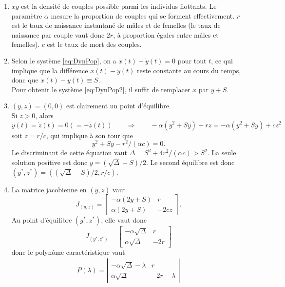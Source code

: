 \begin{enumerate}
  \item $xy$ est la densité de couples possible parmi les individus flottants. Le paramètre $\alpha$ mesure la proportion de couples qui se forment effectivement. $r$ est le taux de naissance instantané de mâles et de femelles (le taux de naissance par couple vaut donc $2r$, à proportion égales entre mâles et femelles). $c$ est le taux de mort des couples.
  \item Selon le système \eqref{eq:DynPop}, on a $\dot x(t) - \dot y(t) = 0$ pour tout $t$, ce qui implique que la différence $x(t) - y(t)$ reste constante au cours du temps, donc que $x(t) - y(t) \equiv S$. \\
  Pour obtenir le système \eqref{eq:DynPop2}, il suffit de remplacer $x$ par $y + S$.
  \item $(y, z) = (0, 0)$ est clairement un point d'équilibre. \\
  Si $z > 0$, alors
  $$
  \dot y(t) = \dot z(t) = 0 (= - \dot z (t)) 
  \qquad \Rightarrow \qquad 
  -\alpha (y^2 + Sy) + r z = -\alpha (y^2 + Sy) + c z^2
  $$
  soit $z = r/c$, qui implique à son tour que
  $$
  y^2 + Sy - r^2/(\alpha c) = 0.
  $$ 
  Le discriminant de cette équation vaut $\Delta = S^2 + 4r^2/(\alpha c) > S^2$. La seule solution positive est donc $y = (\sqrt{\Delta} - S)/2$. Le second équilibre est donc $(y^*, z^*) = ((\sqrt{\Delta} - S)/2, r/c)$.
  \item La matrice jacobienne en $(y, z)$ vaut
  $$
  J_{(y, z)} = \left[\begin{array}{rr}
                      - \alpha (2y + S) & r \\
                      \alpha (2y + S) & -2 cz
                     \end{array}\right].
  $$
  Au point d'équilibre $(y^*, z^*)$, elle vaut donc
  $$
  J_{(y^*, z^*)} = \left[\begin{array}{rr}
                          - \alpha \sqrt{\Delta} & r \\
                          \alpha \sqrt{\Delta} & -2 r
                        \end{array}\right]
  $$
  donc le polynôme caractéristique vaut
  \begin{align*}
    P(\lambda) 
    = \left|\begin{array}{rr}
                - \alpha \sqrt{\Delta} - \lambda & r \\
                \alpha \sqrt{\Delta} & -2 r - \lambda
            \end{array}\right|

\end{align*}
\end{enumerate}
